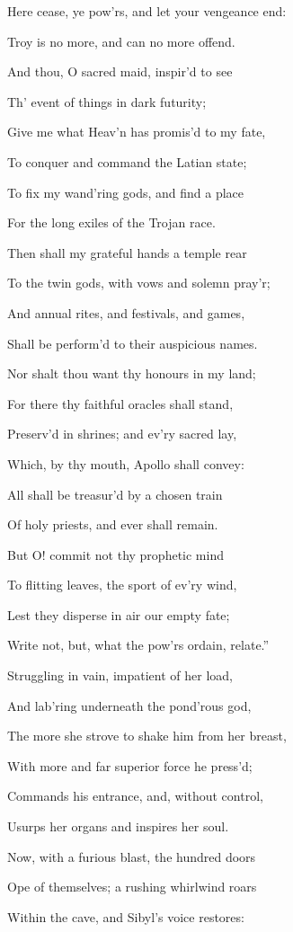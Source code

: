 Here cease, ye pow’rs, and let your vengeance end:

Troy is no more, and can no more offend.

And thou, O sacred maid, inspir’d to see

Th’ event of things in dark futurity;

Give me what Heav’n has promis’d to my fate,

To conquer and command the Latian state;

To fix my wand’ring gods, and find a place

For the long exiles of the Trojan race.

Then shall my grateful hands a temple rear

To the twin gods, with vows and solemn pray’r;

And annual rites, and festivals, and games,

Shall be perform’d to their auspicious names.

Nor shalt thou want thy honours in my land;

For there thy faithful oracles shall stand,

Preserv’d in shrines; and ev’ry sacred lay,

Which, by thy mouth, Apollo shall convey:

All shall be treasur’d by a chosen train

Of holy priests, and ever shall remain.

But O! commit not thy prophetic mind

To flitting leaves, the sport of ev’ry wind,

Lest they disperse in air our empty fate;

Write not, but, what the pow’rs ordain, relate.”

Struggling in vain, impatient of her load,

And lab’ring underneath the pond’rous god,

The more she strove to shake him from her breast,

With more and far superior force he press’d;

Commands his entrance, and, without control,

Usurps her organs and inspires her soul.

Now, with a furious blast, the hundred doors

Ope of themselves; a rushing whirlwind roars

Within the cave, and Sibyl’s voice restores:

